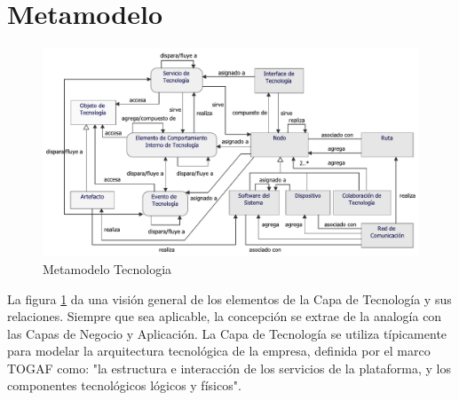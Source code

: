 
\section{Metamodelo}
\begin{figure}[h!]
	\centering
	\includegraphics[width=0.9\linewidth]{imgs/meta/Tecnologia}
	\caption{Metamodelo Tecnologia}
	\label{fig:mTech}
\end{figure}

La figura \ref{fig:mTech} da una visión general de los elementos de la Capa de Tecnología y sus relaciones. Siempre que sea aplicable, la concepción se extrae de la analogía con las Capas de Negocio y Aplicación. La Capa de Tecnología se utiliza típicamente para modelar la arquitectura tecnológica de la empresa, definida por el marco TOGAF como: "la estructura e interacción de los servicios de la plataforma, y los componentes tecnológicos lógicos y físicos".

\newpage

\newpage

\newpage

\newpage

\newpage

\newpage

\newpage
